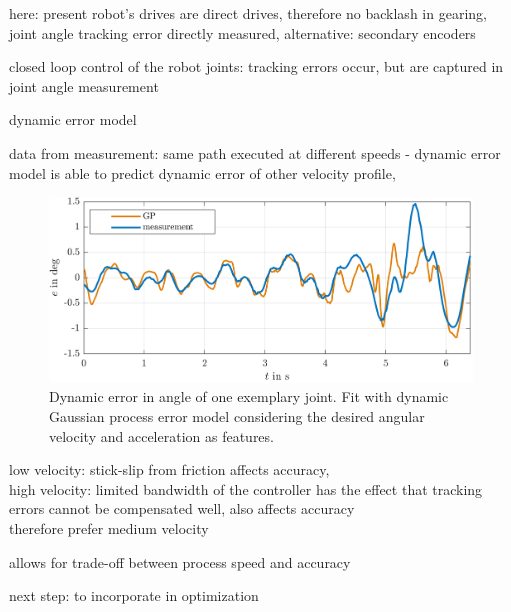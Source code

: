 \documentclass[5p,times,procedia]{elsarticle}
\begin{document}
here: present robot's drives are direct drives, therefore no backlash in gearing, joint angle tracking error directly measured, alternative: secondary encoders~\cite{Mesmer22}

closed loop control of the robot joints: tracking errors occur, but are captured in joint angle measurement

dynamic error model

data from measurement: same path executed at different speeds - dynamic error model is able to predict dynamic error of other velocity profile,

\begin{figure}[h]
	\centering
	\includegraphics[width=\columnwidth]{graphics/GP_eOf_dqDes_ddqDes_trainedOnFastestAndSlowest.png}
	\caption{Dynamic error in angle of one exemplary joint. Fit with dynamic Gaussian process error model considering the desired angular velocity and acceleration as features.}
	\label{fig:error_sources}
\end{figure}

low velocity: stick-slip from friction affects accuracy,\\
high velocity: limited bandwidth of the controller has the effect that tracking errors cannot be compensated well, also affects accuracy \\
therefore prefer medium velocity

allows for trade-off between process speed and accuracy

next step: to incorporate in optimization
\end{document}
